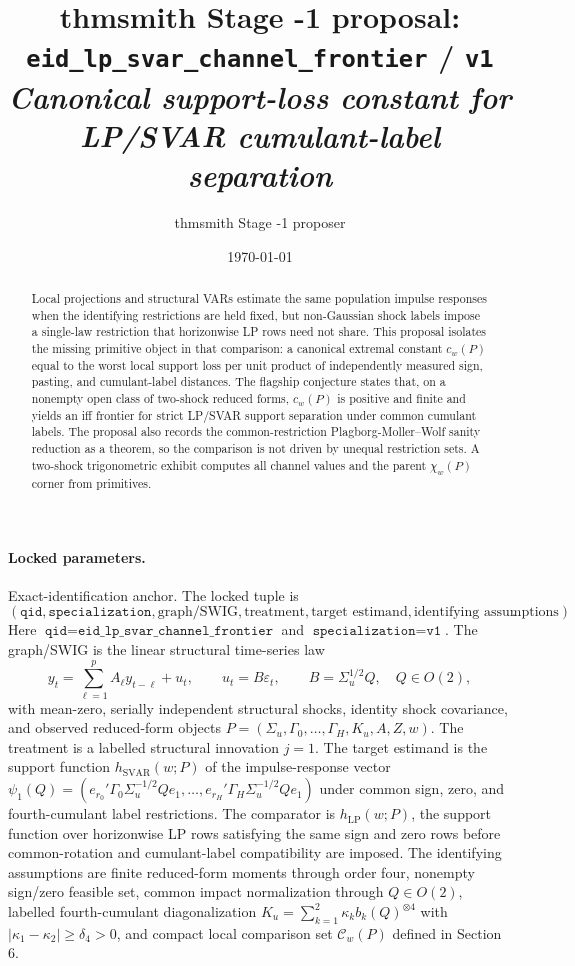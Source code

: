 \documentclass[11pt]{article}
\title{thmsmith Stage -1 proposal: \texttt{eid\_lp\_svar\_channel\_frontier} / \texttt{v1}%
  \\ \large\textit{Canonical support-loss constant for LP/SVAR cumulant-label separation}}
\author{thmsmith Stage -1 proposer}
\date{\today}
\theoremstyle{definition}
\theoremstyle{plain}
\theoremstyle{remark}
\begin{document}
\maketitle


\paragraph{Locked parameters.}
Exact-identification anchor. The locked tuple is
\[
(\texttt{qid},\texttt{specialization},\text{graph/SWIG},\text{treatment},\text{target estimand},\text{identifying assumptions}).
\]
Here \(\texttt{qid}=\texttt{eid\_lp\_svar\_channel\_frontier}\) and \(\texttt{specialization}=\texttt{v1}\). The graph/SWIG is the linear structural time-series law
\[
y_t=\sum_{\ell=1}^p A_\ell y_{t-\ell}+u_t,\qquad u_t=B\varepsilon_t,\qquad B=\Sigma_u^{1/2}Q,\quad Q\in O(2),
\]
with mean-zero, serially independent structural shocks, identity shock covariance, and observed reduced-form objects \(P=(\Sigma_u,\Gamma_0,\ldots,\Gamma_H,K_u,A,Z,w)\). The treatment is a labelled structural innovation \(j=1\). The target estimand is the support function \(h_{\mathrm{SVAR}}(w;P)\) of the impulse-response vector \(\psi_1(Q)=(e_{r_0}'\Gamma_0\Sigma_u^{-1/2}Qe_1,\ldots,e_{r_H}'\Gamma_H\Sigma_u^{-1/2}Qe_1)\) under common sign, zero, and fourth-cumulant label restrictions. The comparator is \(h_{\mathrm{LP}}(w;P)\), the support function over horizonwise LP rows satisfying the same sign and zero rows before common-rotation and cumulant-label compatibility are imposed. The identifying assumptions are finite reduced-form moments through order four, nonempty sign/zero feasible set, common impact normalization through \(Q\in O(2)\), labelled fourth-cumulant diagonalization \(K_u=\sum_{k=1}^2 \kappa_k b_k(Q)^{\otimes 4}\) with \(|\kappa_1-\kappa_2|\ge \delta_4>0\), and compact local comparison set \(\mathcal C_w(P)\) defined in Section 6.

\begin{abstract}
Local projections and structural VARs estimate the same population impulse responses when the identifying restrictions are held fixed, but non-Gaussian shock labels impose a single-law restriction that horizonwise LP rows need not share. This proposal isolates the missing primitive object in that comparison: a canonical extremal constant \(c_w(P)\) equal to the worst local support loss per unit product of independently measured sign, pasting, and cumulant-label distances. The flagship conjecture states that, on a nonempty open class of two-shock reduced forms, \(c_w(P)\) is positive and finite and yields an iff frontier for strict LP/SVAR support separation under common cumulant labels. The proposal also records the common-restriction Plagborg-Moller--Wolf sanity reduction as a theorem, so the comparison is not driven by unequal restriction sets. A two-shock trigonometric exhibit computes all channel values and the parent \(\chi_w(P)\) corner from primitives.
\end{abstract}
\end{document}
